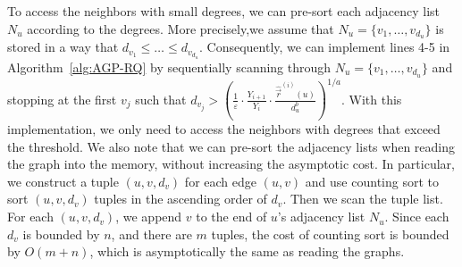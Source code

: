  To access the neighbors with small degrees, we can pre-sort each adjacency list $N_u$ according to the degrees. More precisely,we assume that $N_u = \{v_1, \ldots,v_{d_u}\}$ is stored in a way that $d_{v_1} \le \ldots \le d_{v_{d_u}}$. Consequently, we can implement lines 4-5 in Algorithm~\ref{alg:AGP-RQ} by sequentially scanning through $N_u = \{v_1, \ldots,v_{d_u}\}$ and stopping at the first $v_j$ such that $d_{v_j} > \left( \frac{1}{\varepsilon} \cdot\frac{Y_{i+1}}{Y_i} \cdot \frac{\hat{\vec{r}}^{(i)}(u)}{d_u^b}\right)^{1/a}$. With this implementation, we only need to access the neighbors with degrees that exceed the threshold. We also note that we can pre-sort the adjacency lists when reading the graph into the memory, without increasing the asymptotic cost. In particular, we construct a tuple $(u,v,d_v)$ for each edge $(u,v)$ and use counting sort to sort $(u,v,d_v)$ tuples in the ascending order of $d_v$. Then we scan the tuple list. For each $(u,v,d_v)$, we append $v$ to the end of $u$'s
adjacency list $N_u$. Since each $d_v$ is bounded by $n$, and
there are $m$ tuples, the cost of counting sort is bounded by
$O(m+n)$, which is asymptotically the same as reading the graphs.



 




